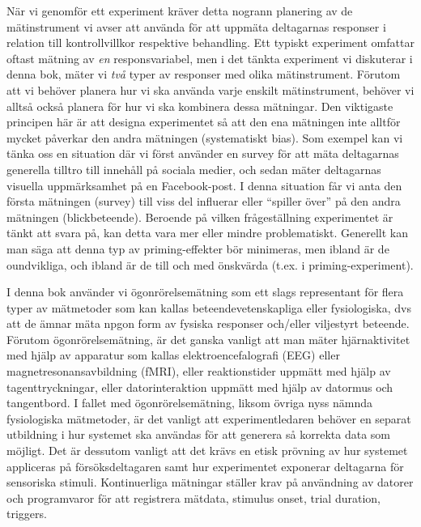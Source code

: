 \documentclass[
]{book}
\begin{document}
När vi genomför ett experiment kräver detta nogrann planering av de mätinstrument vi avser att använda för att uppmäta deltagarnas responser i relation till kontrollvillkor respektive behandling. Ett typiskt experiment omfattar oftast mätning av \emph{en} responsvariabel, men i det tänkta experiment vi diskuterar i denna bok, mäter vi \emph{två} typer av responser med olika mätinstrument. Förutom att vi behöver planera hur vi ska använda varje enskilt mätinstrument, behöver vi alltså också planera för hur vi ska kombinera dessa mätningar. Den viktigaste principen här är att designa experimentet så att den ena mätningen inte alltför mycket påverkar den andra mätningen (systematiskt bias). Som exempel kan vi tänka oss en situation där vi först använder en survey för att mäta deltagarnas generella tilltro till innehåll på sociala medier, och sedan mäter deltagarnas visuella uppmärksamhet på en Facebook-post. I denna situation får vi anta den första mätningen (survey) till viss del influerar eller ``spiller över'' på den andra mätningen (blickbeteende). Beroende på vilken frågeställning experimentet är tänkt att svara på, kan detta vara mer eller mindre problematiskt. Generellt kan man säga att denna typ av priming-effekter bör minimeras, men ibland är de oundvikliga, och ibland är de till och med önskvärda (t.ex. i priming-experiment).

I denna bok använder vi ögonrörelsemätning som ett slags representant för flera typer av mätmetoder som kan kallas beteendevetenskapliga eller fysiologiska, dvs att de ämnar mäta npgon form av fysiska responser och/eller viljestyrt beteende. Förutom ögonrörelsemätning, är det ganska vanligt att man mäter hjärnaktivitet med hjälp av apparatur som kallas elektroencefalografi (EEG) eller magnetresonansavbildning (fMRI), eller reaktionstider uppmätt med hjälp av tagenttryckningar, eller datorinteraktion uppmätt med hjälp av datormus och tangentbord. I fallet med ögonrörelsemätning, liksom övriga nyss nämnda fysiologiska mätmetoder, är det vanligt att experimentledaren behöver en separat utbildning i hur systemet ska användas för att generera så korrekta data som möjligt. Det är dessutom vanligt att det krävs en etisk prövning av hur systemet appliceras på försöksdeltagaren samt hur experimentet exponerar deltagarna för sensoriska stimuli. Kontinuerliga mätningar ställer krav på användning av datorer och programvaror för att registrera mätdata, stimulus onset, trial duration, triggers.
\end{document}
